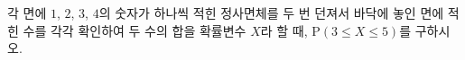 각 면에 $1$, $2$, $3$, $4$의 숫자가 하나씩 적힌 정사면체를 두 번 던져서 바닥에 놓인 면에 적힌 수를 각각 확인하여 두 수의 합을 확률변수 $X$라 할 때, $\mathrm{P}(3\le X\le 5)$를 구하시오.
